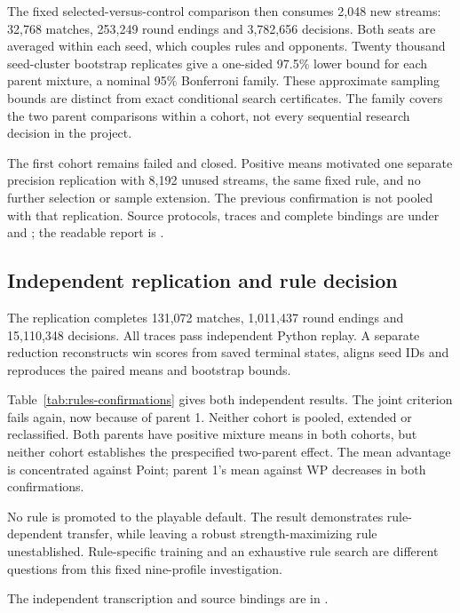 The fixed selected-versus-control comparison then consumes 2,048 new streams:
32,768 matches, 253,249 round endings and 3,782,656 decisions. Both seats are
averaged within each seed, which couples rules and opponents. Twenty thousand
seed-cluster bootstrap replicates give a one-sided 97.5\% lower bound for each
parent mixture, a nominal 95\% Bonferroni family. These approximate sampling
bounds are distinct from exact conditional search certificates.
The family covers the two parent comparisons within a cohort, not every
sequential research decision in the project.



\begin{table}[ht]
\centering\small

\caption{Both-yaku settlement minus paper8 control, equal-opponent mixtures.
The joint positive-lower-bound criterion fails in each separate cohort.}
\label{tab:rules-confirmations}
\end{table}

The first cohort remains failed and closed. Positive means motivated one
separate precision replication with 8,192 unused streams, the same fixed rule,
and no further selection or sample extension. The previous confirmation is
not pooled with that replication. Source protocols, traces and complete
bindings are under  and
; the readable report is
.

\subsection{Independent replication and rule decision}
The replication completes 131,072 matches, 1,011,437 round endings and
15,110,348 decisions. All traces pass independent Python replay. A separate
reduction reconstructs win scores from saved terminal states, aligns seed IDs
and reproduces the paired means and bootstrap bounds.



Table~\ref{tab:rules-confirmations} gives both independent results.
The joint criterion fails again, now because of parent 1.
Neither cohort is pooled, extended or reclassified. Both parents have positive
mixture means in both cohorts, but neither cohort establishes the prespecified
two-parent effect. The mean advantage is concentrated against Point;
parent 1's mean against WP decreases in both confirmations.

No rule is promoted to the playable default. The result demonstrates
rule-dependent transfer, while leaving a robust strength-maximizing rule
unestablished. Rule-specific training and an exhaustive rule search are
different questions from this fixed nine-profile investigation.

The independent transcription and source bindings are in
.
